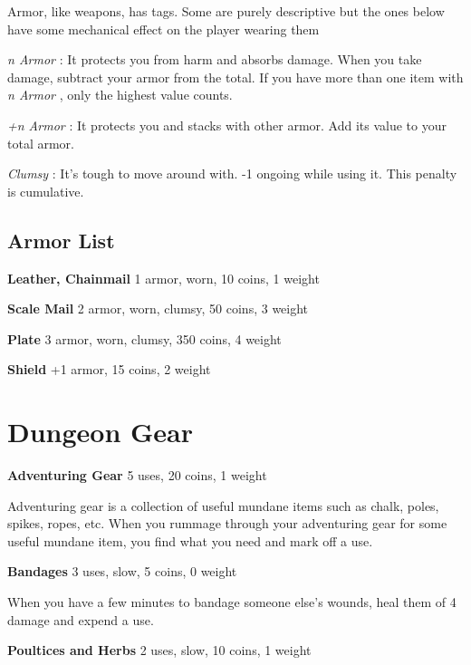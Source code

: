 Armor, like weapons, has tags. Some are purely descriptive but the ones below have some mechanical effect on the player wearing them

\emph{n Armor}
: It protects you from harm and absorbs damage. When you take damage, subtract your armor from the total. If you have more than one item with \emph{n Armor}
, only the highest value counts. 

\emph{+n Armor}
: It protects you and stacks with other armor. Add its value to your total armor.

\emph{Clumsy}
: It's tough to move around with. -1 ongoing while using it. This penalty is cumulative.
\subsection{Armor List}
{\noindent \bfseries Leather, Chainmail} \hspace*{\fill} 1 armor, worn, 10 coins, 1 weight

{\noindent \bfseries Scale Mail} \hspace*{\fill} 2 armor, worn, clumsy, 50 coins, 3 weight

{\noindent \bfseries Plate} \hspace*{\fill} 3 armor, worn, clumsy, 350 coins, 4 weight

{\noindent \bfseries Shield} \hspace*{\fill} +1 armor, 15 coins, 2 weight
\section*{Dungeon Gear}

{\noindent \bfseries Adventuring Gear} \hspace*{\fill} 5 uses, 20 coins, 1 weight

Adventuring gear is a collection of useful mundane items such as chalk, poles, spikes, ropes, etc. When you rummage through your adventuring gear for some useful mundane item, you find what you need and mark off a use.

{\noindent \bfseries Bandages} \hspace*{\fill} 3 uses, slow, 5 coins, 0 weight

When you have a few minutes to bandage someone else's wounds, heal them of 4 damage and expend a use.

{\noindent \bfseries Poultices and Herbs} \hspace*{\fill} 2 uses, slow, 10 coins, 1 weight

